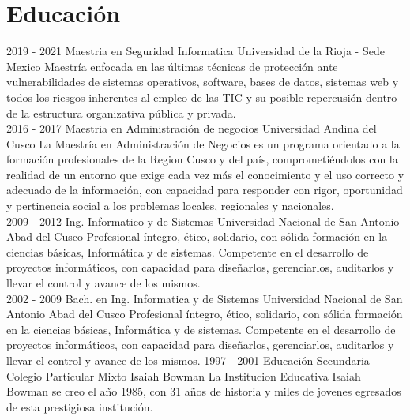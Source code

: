 \documentclass[]{friggeri-cv}
\begin{document}
\section{Educaci\'on}
\begin{entrylist}
    \entry
    {2019 - 2021}
    {Maestria en Seguridad Informatica}
    {Universidad de la Rioja - Sede Mexico}
    {Maestría enfocada en las \'ultimas t\'ecnicas de protecci\'on ante
    vulnerabilidades de sistemas operativos, software, bases de datos, sistemas
    web y todos los riesgos inherentes al empleo de las TIC y su posible repercusi\'on
    dentro de la estructura organizativa p\'ublica y privada.\\}
    \entry
    {2016 - 2017}
    {Maestria en Administraci\'on de negocios}
    {Universidad Andina del Cusco}
    {La Maestr\'ia en Administraci\'on de Negocios es un programa orientado a la formaci\'on
    profesionales de la Region Cusco y  del pa\'is, comprometi\'endolos con la realidad
    de un entorno que exige cada vez m\'as el conocimiento y el uso correcto y
    adecuado de la informaci\'on, con capacidad para responder con rigor, oportunidad
    y pertinencia social a los problemas locales, regionales y nacionales.\\}
    \entry
    {2009 - 2012}
    {Ing. Informatico y de Sistemas}
    {Universidad Nacional de San Antonio Abad del Cusco}
    {Profesional \'integro, \'etico, solidario, con s\'olida formaci\'on en la ciencias
    b\'asicas, Inform\'atica y de sistemas. Competente en el desarrollo de proyectos
    inform\'aticos, con capacidad para dise\~narlos, gerenciarlos, auditarlos y
    llevar el control y avance de los mismos.\\}
    \entry
    {2002 - 2009}
    {Bach. en Ing. Informatica y de Sistemas}
    {Universidad Nacional de San Antonio Abad del Cusco}
    {Profesional \'integro, \'etico, solidario, con s\'olida formaci\'on en la ciencias
    b\'asicas, Inform\'atica y de sistemas. Competente en el desarrollo de proyectos
    inform\'aticos, con capacidad para dise\~narlos, gerenciarlos, auditarlos y
    llevar el control y avance de los mismos.}
    \entry
    {1997 - 2001}
    {Educaci\'on Secundaria}
    {Colegio Particular Mixto Isaiah Bowman}
    {La Institucion Educativa Isaiah Bowman se creo el a\~no 1985, con 31 a\~nos de historia
    y miles de jovenes egresados de esta prestigiosa instituci\'on.}
\end{entrylist}
\\
\end{document}
